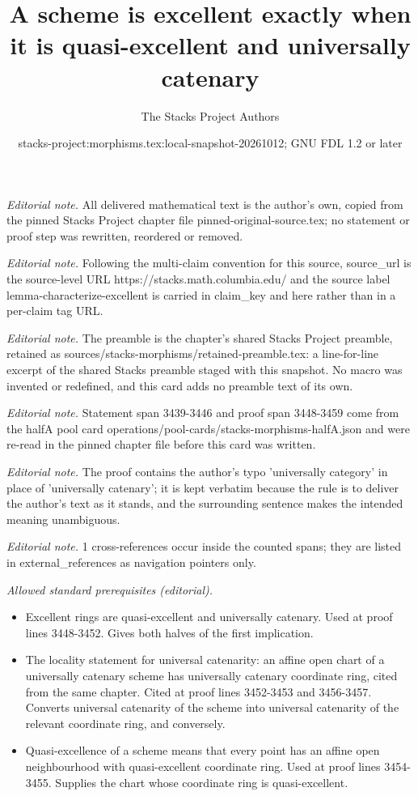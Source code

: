 \documentclass[10pt,a4paper]{amsart}
\title{A scheme is excellent exactly when it is quasi-excellent and universally catenary}
\author{The Stacks Project Authors}
\date{stacks-project:morphisms.tex:local-snapshot-20261012; GNU FDL 1.2 or later}
\theoremstyle{plain}
\theoremstyle{definition}
\theoremstyle{remark}
\numberwithin{equation}{subsection}
\begin{document}
\maketitle
\noindent\textit{Editorial note.} All delivered mathematical text is the author's own, copied from the pinned Stacks Project chapter file pinned-original-source.tex; no statement or proof step was rewritten, reordered or removed.\par\medskip
\noindent\textit{Editorial note.} Following the multi-claim convention for this source, source\_url is the source-level URL https://stacks.math.columbia.edu/ and the source label lemma-characterize-excellent is carried in claim\_key and here rather than in a per-claim tag URL.\par\medskip
\noindent\textit{Editorial note.} The preamble is the chapter's shared Stacks Project preamble, retained as sources/stacks-morphisms/retained-preamble.tex: a line-for-line excerpt of the shared Stacks preamble staged with this snapshot. No macro was invented or redefined, and this card adds no preamble text of its own.\par\medskip
\noindent\textit{Editorial note.} Statement span 3439-3446 and proof span 3448-3459 come from the halfA pool card operations/pool-cards/stacks-morphisms-halfA.json and were re-read in the pinned chapter file before this card was written.\par\medskip
\noindent\textit{Editorial note.} The proof contains the author's typo 'universally category' in place of 'universally catenary'; it is kept verbatim because the rule is to deliver the author's text as it stands, and the surrounding sentence makes the intended meaning unambiguous.\par\medskip
\noindent\textit{Editorial note.} 1 cross-references occur inside the counted spans; they are listed in external\_references as navigation pointers only.\par\medskip
\noindent\textit{Allowed standard prerequisites (editorial).}\begin{itemize}
\item Excellent rings are quasi-excellent and universally catenary. Used at proof lines 3448-3452. Gives both halves of the first implication.
\item The locality statement for universal catenarity: an affine open chart of a universally catenary scheme has universally catenary coordinate ring, cited from the same chapter. Cited at proof lines 3452-3453 and 3456-3457. Converts universal catenarity of the scheme into universal catenarity of the relevant coordinate ring, and conversely.
\item Quasi-excellence of a scheme means that every point has an affine open neighbourhood with quasi-excellent coordinate ring. Used at proof lines 3454-3455. Supplies the chart whose coordinate ring is quasi-excellent.
\end{itemize}\medskip
\end{document}

